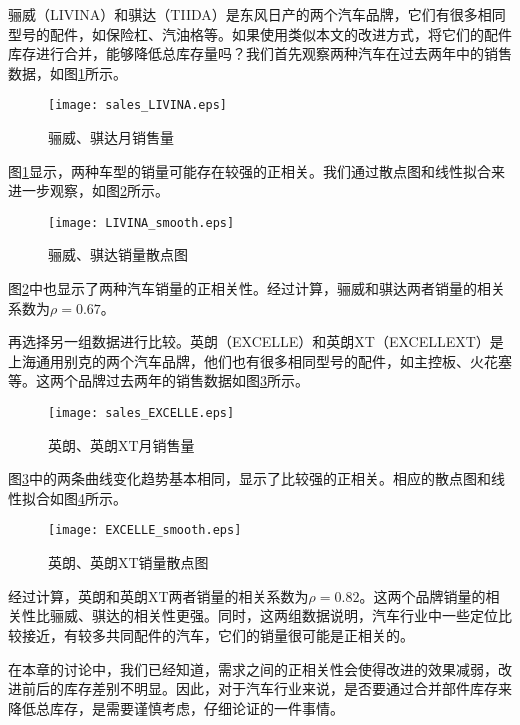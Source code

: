 骊威（LIVINA）和骐达（TIIDA）是东风日产的两个汽车品牌，它们有很多相同型号的配件，如保险杠、汽油格等。如果使用类似本文的改进方式，将它们的配件库存进行合并，能够降低总库存量吗？我们首先观察两种汽车在过去两年中的销售数据，如图\ref{fig:骊威、骐达销售数据}所示。

\begin{figure}[hb]
\centering
\texttt{[image: sales\_LIVINA.eps]}
\caption{骊威、骐达月销售量}
\label{fig:骊威、骐达销售数据}
\end{figure}

图\ref{fig:骊威、骐达销售数据}显示，两种车型的销量可能存在较强的正相关。我们通过散点图和线性拟合来进一步观察，如图\ref{fig:骊威、骐达散点图}所示。

\begin{figure}[htb]
\centering
\texttt{[image: LIVINA\_smooth.eps]}
\caption{骊威、骐达销量散点图}
\label{fig:骊威、骐达散点图}
\end{figure}

图\ref{fig:骊威、骐达散点图}中也显示了两种汽车销量的正相关性。经过计算，骊威和骐达两者销量的相关系数为$\rho=0.67$。

再选择另一组数据进行比较。英朗（EXCELLE）和英朗XT（EXCELLEXT）是上海通用别克的两个汽车品牌，他们也有很多相同型号的配件，如主控板、火花塞等。这两个品牌过去两年的销售数据如图\ref{fig:英朗销售数据}所示。

\begin{figure}[htb]
\centering
\texttt{[image: sales\_EXCELLE.eps]}
\caption{英朗、英朗XT月销售量}
\label{fig:英朗销售数据}
\end{figure}

图\ref{fig:英朗销售数据}中的两条曲线变化趋势基本相同，显示了比较强的正相关。相应的散点图和线性拟合如图\ref{fig:英朗散点图}所示。

\begin{figure}[htb]
\centering
\texttt{[image: EXCELLE\_smooth.eps]}
\caption{英朗、英朗XT销量散点图}
\label{fig:英朗散点图}
\end{figure}

经过计算，英朗和英朗XT两者销量的相关系数为$\rho=0.82$。这两个品牌销量的相关性比骊威、骐达的相关性更强。同时，这两组数据说明，汽车行业中一些定位比较接近，有较多共同配件的汽车，它们的销量很可能是正相关的。

在本章的讨论中，我们已经知道，需求之间的正相关性会使得改进的效果减弱，改进前后的库存差别不明显。因此，对于汽车行业来说，是否要通过合并部件库存来降低总库存，是需要谨慎考虑，仔细论证的一件事情。
















